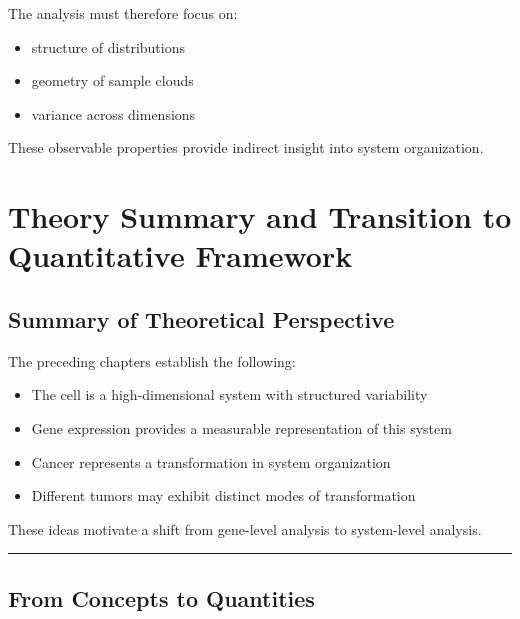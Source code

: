 \documentclass[
  letterpaper,
  DIV=11,
  numbers=noendperiod,
  openany,
  oneside]{scrreprt}
\providecommand{\tightlist}{%
  \setlength{\itemsep}{0pt}\setlength{\parskip}{0pt}}
\begin{document}
The analysis must therefore focus on:

\begin{itemize}
\tightlist
\item
  structure of distributions\\
\item
  geometry of sample clouds\\
\item
  variance across dimensions
\end{itemize}

These observable properties provide indirect insight into system
organization.

\chapter{Theory Summary and Transition to Quantitative
Framework}\label{theory-summary-and-transition-to-quantitative-framework}

\section{Summary of Theoretical
Perspective}\label{summary-of-theoretical-perspective}

The preceding chapters establish the following:

\begin{itemize}
\tightlist
\item
  The cell is a high-dimensional system with structured variability\\
\item
  Gene expression provides a measurable representation of this system\\
\item
  Cancer represents a transformation in system organization\\
\item
  Different tumors may exhibit distinct modes of transformation
\end{itemize}

These ideas motivate a shift from gene-level analysis to system-level
analysis.

\begin{center}\rule{0.5\linewidth}{0.5pt}\end{center}

\section{From Concepts to Quantities}\label{from-concepts-to-quantities}
\end{document}
